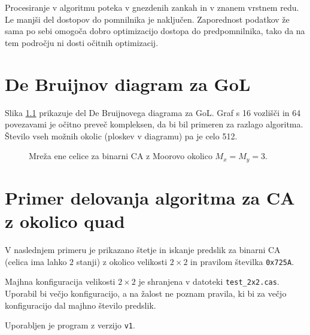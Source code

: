 \documentclass[12pt,a4paper,openany,twoside]{book}
\begin{document}
Procesiranje v algoritmu poteka v gnezdenih zankah in v znanem vrstnem redu.
Le manjši del dostopov do pomnilnika je naključen.
Zaporednost podatkov že sama po sebi omogoča dobro optimizacijo dostopa do predpomnilnika,
tako da na tem področju ni dosti očitnih optimizacij.





\appendix

\chapter{De Bruijnov diagram za GoL}
\label{GoLmatrika}

Slika \ref{network_single_moore} prikazuje del De Bruijnovega diagrama za GoL.
Graf s 16 vozlišči in 64 povezavami je očitno preveč kompleksen, da bi bil primeren za razlago algoritma.
Število vseh možnih okolic (ploskev v diagramu) pa je celo 512.

\begin{figure}[htb]
\centerline{}
\caption[Mreža ene celice za GoL.]{Mreža ene celice za binarni CA z Moorovo okolico \(M_x=M_y=3\).}
\label{network_single_moore}
\end{figure}




\chapter{Primer delovanja algoritma za CA z okolico quad}
\label{primer}

V naslednjem primeru je prikazano štetje in iskanje predslik
za binarni CA (celica ima lahko \(2\) stanji) z okolico velikosti \(2 \times 2\)
in pravilom številka \verb|0x725A|.

Majhna konfiguracija velikosti \(2 \times 2\) je shranjena v datoteki \verb|test_2x2.cas|.
Uporabil bi večjo konfiguracijo, a na žalost ne poznam pravila,
ki bi za večjo konfiguracijo dal majhno število predslik.

Uporabljen je program \cite{Jeras2016-algirithm} z verzijo \verb|v1|.
\end{document}
